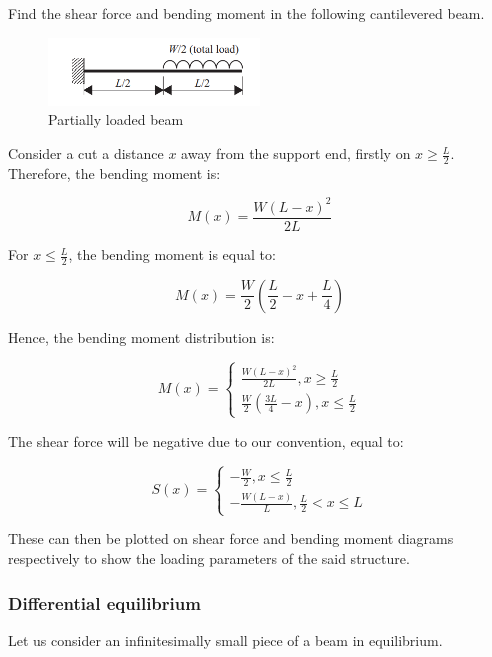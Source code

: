 \documentclass{article}
\begin{document}
\begin{example}
    Find the shear force and bending moment in the following cantilevered beam.

    \begin{figure}[h]
        \centering
        \includegraphics[width = 0.5\textwidth]{images/examplebeam.png}
        \caption{Partially loaded beam}
        \label{fig:enter-label}
    \end{figure}

    Consider a cut a distance $x$ away from the support end, firstly on $x \geq \frac{L}{2}$. Therefore, the bending moment is:

    \[ M(x) = \frac{W(L-x)^2}{2L} \]

    For $x \leq \frac{L}{2}$, the bending moment is equal to:

    \[ M(x) = \frac{W}{2}\left(\frac{L}{2} - x + \frac{L}{4}\right) \]

    Hence, the bending moment distribution is:

    \[ M(x) = \begin{cases}
        \frac{W(L-x)^2}{2L}, x \geq \frac{L}{2} \\
        \frac{W}{2}\left(\frac{3L}{4} - x\right), x \leq \frac{L}{2}
    \end{cases} \]

    The shear force will be negative due to our convention, equal to:

    \[ S(x) = \begin{cases}
        -\frac{W}{2}, x \leq \frac{L}{2} \\
        -\frac{W(L - x)}{L}, \frac{L}{2} < x \leq L
    \end{cases} \]
\end{example}

These can then be plotted on shear force and bending moment diagrams respectively to show the loading parameters of the said structure.

\newpage

\subsubsection{Differential equilibrium}

Let us consider an infinitesimally small piece of a beam in equilibrium.
\end{document}
